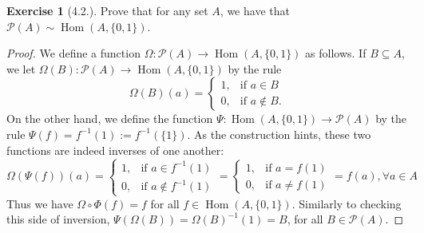 \documentclass[9pt,reqno]{amsart}
\theoremstyle{definition}
\newtheorem{exercise}{Exercise}[section]
\DeclareMathOperator{\Hom}{Hom}
\begin{document}
\begin{exercise}[4.2.] Prove that for any set $A$, we have that $\mathcal P (A) \sim \Hom (A, \{0,1 \})$.
\end{exercise}
\begin{proof}
	We define a function $\Omega \colon \mathcal P (A) \to \Hom(A, \{ 0,1 \} )$ as follows. If $B \subseteq A$, we let $\Omega (B) \colon \mathcal P (A) \to \Hom (A, \{0,1 \})$ by the rule 
	\[
	\Omega (B) (a) = \begin{cases}
		1, & \text{if } a \in B \\
		0, & \text{if } a \notin B.
	\end{cases}
	\] On the other hand, we define the function $\Psi \colon \Hom (A, \{0,1 \}) \to \mathcal P(A)$ by the rule $\Psi (f) = f^{-1}(1) := f^{-1} (\{1\})$. As the construction hints, these two functions are indeed inverses of one another:
	\[
	\Omega (\Psi(f))(a) = \begin{cases}
		1, & \text{if } a \in f^{-1} (1) \\
		0, & \text{if } a \notin f^{-1} (1) 
	\end{cases} = \begin{cases}
		1, & \text{if } a = f(1) \\
		0, & \text{if } a \neq  f(1) 
	\end{cases} = f(a), \forall a \in A
	\] Thus we have $\Omega \circ \Phi (f) = f$ for all $f \in \Hom (A, \{0,1 \})$. Similarly to checking this side of inversion, $\Psi(\Omega(B)) = \Omega (B)^{-1} (1) = B$, for all $B \in \mathcal P (A)$.
\end{proof}
\end{document}
